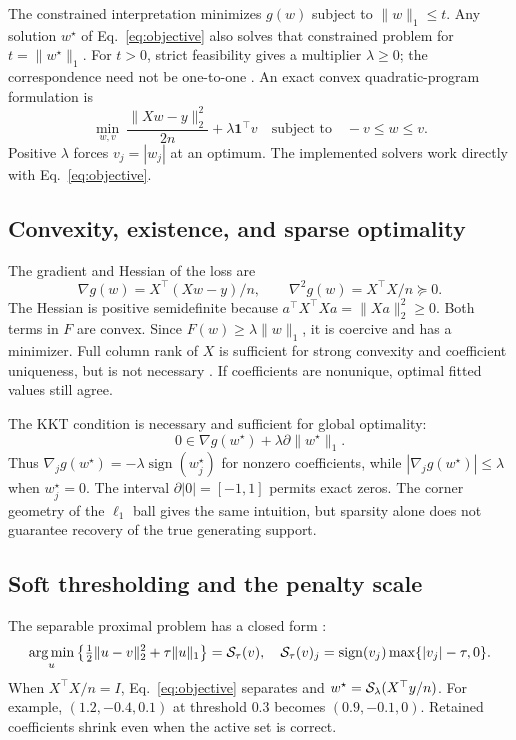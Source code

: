 \documentclass[10pt,letterpaper]{article}
\begin{document}
The constrained interpretation minimizes $g(w)$ subject to $\|w\|_1\leq t$. Any solution $w^\star$ of Eq.~\eqref{eq:objective} also solves that constrained problem for $t=\|w^\star\|_1$. For $t>0$, strict feasibility gives a multiplier $\lambda\geq0$; the correspondence need not be one-to-one \citep{boyd2004}. An exact convex quadratic-program formulation is
\begin{equation}
 \min_{w,v}\ \frac{\|Xw-y\|_2^2}{2n}+\lambda\mathbf{1}^\top v
 \quad\text{subject to}\quad -v\leq w\leq v.
 \label{eq:qp}
\end{equation}
Positive $\lambda$ forces $v_j=|w_j|$ at an optimum. The implemented solvers work directly with Eq.~\eqref{eq:objective}.

\subsection{Convexity, existence, and sparse optimality}
The gradient and Hessian of the loss are
\begin{equation}
 \nabla g(w)=X^\top(Xw-y)/n,\qquad \nabla^2g(w)=X^\top X/n\succeq0.
 \label{eq:gradient}
\end{equation}
The Hessian is positive semidefinite because $a^\top X^\top Xa=\|Xa\|_2^2\geq0$. Both terms in $F$ are convex. Since $F(w)\geq\lambda\|w\|_1$, it is coercive and has a minimizer. Full column rank of $X$ is sufficient for strong convexity and coefficient uniqueness, but is not necessary \citep{tibshirani2013}. If coefficients are nonunique, optimal fitted values still agree.

The KKT condition is necessary and sufficient for global optimality:
\begin{equation}
 0\in\nabla g(w^\star)+\lambda\partial\|w^\star\|_1.
 \label{eq:kkt}
\end{equation}
Thus $\nabla_jg(w^\star)=-\lambda\operatorname{sign}(w_j^\star)$ for nonzero coefficients, while $|\nabla_jg(w^\star)|\leq\lambda$ when $w_j^\star=0$. The interval $\partial|0|=[-1,1]$ permits exact zeros. The corner geometry of the $\ell_1$ ball gives the same intuition, but sparsity alone does not guarantee recovery of the true generating support.

\subsection{Soft thresholding and the penalty scale}
The separable proximal problem has a closed form \citep{parikh2014}:
\begin{equation}
 \operatorname*{arg\,min}_u\left\{\tfrac12\|u-v\|_2^2+\tau\|u\|_1\right\}
 =\mathcal{S}_\tau(v),\quad
 \mathcal{S}_\tau(v)_j=\operatorname{sign}(v_j)\max\{|v_j|-\tau,0\}.
 \label{eq:soft}
\end{equation}
When $X^\top X/n=I$, Eq.~\eqref{eq:objective} separates and $w^\star=\mathcal{S}_\lambda(X^\top y/n)$. For example, $(1.2,-0.4,0.1)$ at threshold $0.3$ becomes $(0.9,-0.1,0)$. Retained coefficients shrink even when the active set is correct.
\end{document}
